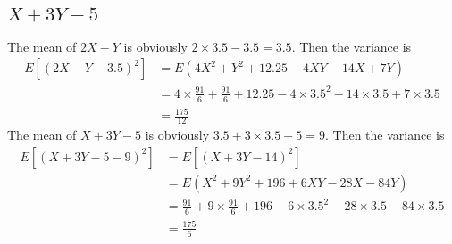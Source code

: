\documentclass[answers]{exam}
\begin{document}
\begin{questions}
\begin{parts}
\part{$X+3Y-5$}
\end{parts}

\begin{solution}
	The mean of $2X-Y$ is obviously $2\times3.5-3.5 = 3.5$. Then the variance is
	\begin{align*}
		E[(2X-Y-3.5)^2] &= E(4X^2 + Y^2 + 12.25 - 4XY - 14X + 7Y) \\
				&= 4\times\frac{91}{6} + \frac{91}{6} + 12.25 - 4\times3.5^2 - 14\times3.5 + 7\times3.5 \\
				&= \frac{175}{12}
	\end{align*}
	The mean of $X+3Y-5$ is obviously $3.5+3\times3.5-5 = 9$. Then the variance is
	\begin{align*}
		E[(X+3Y-5-9)^2] &= E[(X+3Y-14)^2] \\
				&= E(X^2 + 9Y^2 + 196 + 6XY - 28X - 84Y) \\
				&= \frac{91}{6} + 9\times\frac{91}{6} + 196 + 6\times3.5^2 - 28\times3.5 - 84\times3.5 \\
				&= \frac{175}{6}
	\end{align*}
\end{solution}

\end{questions}
\end{document}
